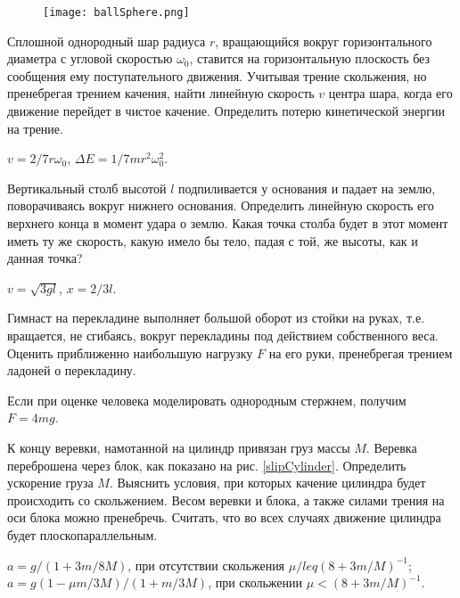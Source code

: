 \begin{figure}[h]
\centering
\texttt{[image: ballSphere.png]}
\caption{}
\label{ballSphere}
\end{figure}

\begin{ex} %
Сплошной однородный шар радиуса $r$, вращающийся вокруг горизонтального диаметра с угловой скоростью $\omega_0$, ставится на горизонтальную плоскость без сообщения ему поступательного движения. Учитывая трение скольжения, но пренебрегая трением качения, найти линейную скорость $v$ центра шара, когда его движение перейдет в чистое качение. Определить потерю кинетической энергии на трение.
\begin{ans}
$v = 2/7r \omega_0$, $\Delta E = 1/7 mr^2 \omega_0^2$.
\end{ans}
\end{ex}	

\begin{ex} %
Вертикальный столб высотой $l$ подпиливается у основания и падает на землю, поворачиваясь вокруг нижнего основания. Определить линейную скорость его верхнего конца в момент удара о землю. Какая точка столба будет в этот момент иметь ту же скорость, какую имело бы тело, падая с той, же высоты, как и данная точка?
\begin{ans}
$v = \sqrt{3gl}$, $x = 2/3l$.
\end{ans}
\end{ex}	

\begin{ex} %
Гимнаст на перекладине выполняет большой оборот из стойки на руках, т.е. вращается, не сгибаясь, вокруг перекладины под действием собственного веса. Оценить приближенно наибольшую нагрузку $F$ на его руки, пренебрегая трением ладоней о перекладину.
\begin{ans}
Если при оценке человека моделировать однородным стержнем, получим $F = 4mg$.
\end{ans}
\end{ex}	

\begin{ex} %
К концу веревки, намотанной на цилиндр привязан груз массы $M$. Веревка переброшена через блок, как показано на рис. \ref{slipCylinder}. Определить ускорение груза $M$. Выяснить условия, при которых качение цилиндра будет происходить со скольжением. Весом веревки и блока, а также силами трения на оси блока можно пренебречь. Считать, что во всех случаях движение цилиндра будет плоскопараллельным.
\begin{ans}
$a = g/(1+3m/8M)$, при отсутствии скольжения $\mu /leq (8+3m/M)^{-1}$; $a = g(1 - \mu m/3M)/(1+m/3M)$, при скольжении $\mu < (8+3m/M)^{-1}$.
\end{ans}
\end{ex}	

